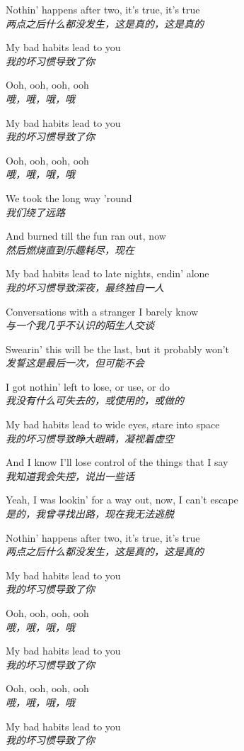 \begin{spacing}{1.5}
\begin{flushleft}
Nothin' happens after two, it's true, it's true\\
\textit{两点之后什么都没发生，这是真的，这是真的}\lyricspace

My bad habits lead to you\\
\textit{我的坏习惯导致了你}\lyricspace

Ooh, ooh, ooh, ooh\\
\textit{哦，哦，哦，哦}\lyricspace

My bad habits lead to you\\
\textit{我的坏习惯导致了你}\lyricspace

Ooh, ooh, ooh, ooh\\
\textit{哦，哦，哦，哦}\lyricspace

We took the long way 'round\\
\textit{我们绕了远路}\lyricspace

And burned till the fun ran out, now\\
\textit{然后燃烧直到乐趣耗尽，现在}\lyricspace

My bad habits lead to late nights, endin' alone\\
\textit{我的坏习惯导致深夜，最终独自一人}\lyricspace

Conversations with a stranger I barely know\\
\textit{与一个我几乎不认识的陌生人交谈}\lyricspace

Swearin' this will be the last, but it probably won't\\
\textit{发誓这是最后一次，但可能不会}\lyricspace

I got nothin' left to lose, or use, or do\\
\textit{我没有什么可失去的，或使用的，或做的}\lyricspace

My bad habits lead to wide eyes, stare into space\\
\textit{我的坏习惯导致睁大眼睛，凝视着虚空}\lyricspace

And I know I'll lose control of the things that I say\\
\textit{我知道我会失控，说出一些话}\lyricspace

Yeah, I was lookin' for a way out, now, I can't escape\\
\textit{是的，我曾寻找出路，现在我无法逃脱}\lyricspace

Nothin' happens after two, it's true, it's true\\
\textit{两点之后什么都没发生，这是真的，这是真的}\lyricspace

My bad habits lead to you\\
\textit{我的坏习惯导致了你}\lyricspace

Ooh, ooh, ooh, ooh\\
\textit{哦，哦，哦，哦}\lyricspace

My bad habits lead to you\\
\textit{我的坏习惯导致了你}\lyricspace

Ooh, ooh, ooh, ooh\\
\textit{哦，哦，哦，哦}\lyricspace

My bad habits lead to you\\
\textit{我的坏习惯导致了你}\lyricspace
\end{flushleft}
\end{spacing} 
